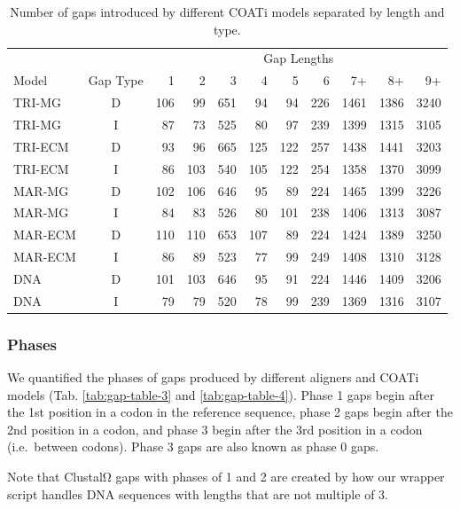 \documentclass[
]{article}
\begin{document}
\begin{table}[H]
\centering
\caption{\label{tab:gap-table-2}Number of gaps introduced by different COATi models separated by length and type.}
\centering
\begin{tabular}[t]{lcrrrrrrrrr}
\toprule
\multicolumn{2}{c}{ } & \multicolumn{9}{c}{Gap Lengths} \\
\cmidrule(l{3pt}r{3pt}){3-11}
Model & Gap Type & 1 & 2 & 3 & 4 & 5 & 6 & 7+ & 8+ & 9+\\
\midrule
TRI-MG & D & 106 & 99 & 651 & 94 & 94 & 226 & 1461 & 1386 & 3240\\
TRI-MG & I & 87 & 73 & 525 & 80 & 97 & 239 & 1399 & 1315 & 3105\\
\addlinespace
TRI-ECM & D & 93 & 96 & 665 & 125 & 122 & 257 & 1438 & 1441 & 3203\\
TRI-ECM & I & 86 & 103 & 540 & 105 & 122 & 254 & 1358 & 1370 & 3099\\
\addlinespace
MAR-MG & D & 102 & 106 & 646 & 95 & 89 & 224 & 1465 & 1399 & 3226\\
MAR-MG & I & 84 & 83 & 526 & 80 & 101 & 238 & 1406 & 1313 & 3087\\
\addlinespace
MAR-ECM & D & 110 & 110 & 653 & 107 & 89 & 224 & 1424 & 1389 & 3250\\
MAR-ECM & I & 86 & 89 & 523 & 77 & 99 & 249 & 1408 & 1310 & 3128\\
\addlinespace
DNA & D & 101 & 103 & 646 & 95 & 91 & 224 & 1446 & 1409 & 3206\\
DNA & I & 79 & 79 & 520 & 78 & 99 & 239 & 1369 & 1316 & 3107\\
\bottomrule
\end{tabular}
\end{table}

\subsubsection{Phases}\label{phases}

We quantified the phases of gaps produced by different aligners and COATi
models (Tab. \ref{tab:gap-table-3} and \ref{tab:gap-table-4}). Phase 1 gaps
begin after the 1st position in a codon in the reference sequence, phase 2 gaps
begin after the 2nd position in a codon, and phase 3 begin after the 3rd
position in a codon (i.e.~between codons). Phase 3 gaps are also known as phase
0 gaps.

Note that ClustalΩ gaps with phases of 1 and 2 are created by how our wrapper
script handles DNA sequences with lengths that are not multiple of 3.
\end{document}
